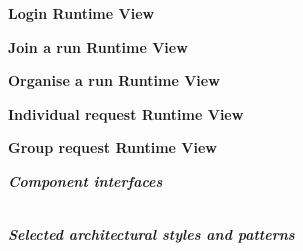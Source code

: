 \begin{legal}
\begin{legal}
				\item \textbf{Login Runtime View}\\
				\item \textbf{Join a run Runtime View}\\
				\item \textbf{Organise a run Runtime View}\\
				\item \textbf{Individual request Runtime View}\\
				\item \textbf{Group request Runtime View}\\
			\end {legal}
		\item \textit{\textbf{Component interfaces}}\\\\
		\item \textit{\textbf{Selected architectural styles and patterns}}\\\\
  	\end{legal}
